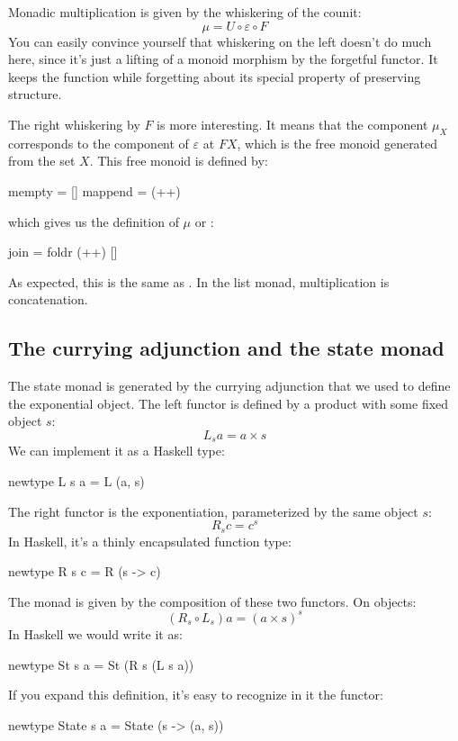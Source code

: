 \documentclass[DaoFP]{subfiles}
\begin{document}
Monadic multiplication is given by the whiskering of the counit:
\[ \mu = U \circ \varepsilon \circ F \]
You can easily convince yourself that whiskering on the left doesn't do much here, since it's just a lifting of a monoid morphism by the forgetful functor. It keeps the function while forgetting about its special property of preserving structure. 

The right whiskering by $F$ is more interesting. It means that the component $\mu_X$ corresponds to the component of $\varepsilon$ at $F X$, which is the free monoid generated from the set $X$. This  free monoid is defined by:
\begin{haskell}
mempty = []
mappend = (++)
\end{haskell}
which gives us the definition of $\mu$ or :
\begin{haskell}
join = foldr (++) []
\end{haskell}
As expected, this is the same as . In the list monad, multiplication is concatenation.

\subsection{The currying adjunction and the state monad}

The state monad is generated by the currying adjunction that we used to define the exponential object. The left functor is defined by a product with some fixed object $s$:
\[ L_s a = a \times s \]
We can implement it as a Haskell type:
\begin{haskell}
newtype L s a = L (a, s)
\end{haskell}
The right functor is the exponentiation, parameterized by the same object $s$:
\[ R_s c = c^s \]
In Haskell, it's a thinly encapsulated function type:
\begin{haskell}
newtype R s c = R (s -> c)
\end{haskell}

The monad is given by the composition of these two functors. On objects:
\[(R_s \circ L_s) a = (a \times s)^s \]
In Haskell we would write it as:
\begin{haskell}
newtype St s a = St (R s (L s a))
\end{haskell}
If you expand this definition, it's easy to recognize in it the  functor:
\begin{haskell}
newtype State s a = State (s -> (a, s))
\end{haskell}
\end{document}
